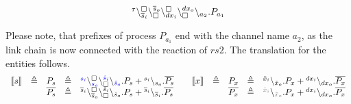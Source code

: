 \begin{example}
\[\begin{array}{lcl}
\startchain{\silent}\chainedlink{\overline{s}_i}{\noact}\chainedlink{\noact}{\overline{s}_o}    \chainedlink{dx_i}{\noact}\chainedlink{\noact}{dx_o}\chainend{a_2}.P_{a_1}\\
%
\end{array}
\]

\noindent
Please note, that prefixes of process $P_{a_1}$ end with the channel name $a_2$, as the link chain is now connected with the  reaction of  $rs2$.
The translation for the entities follows.
\[
\begin{array}{lclcl@{\qquad}lclcl}
\llbracket s \rrbracket &\defeq &P_{s}&\defeq &\startchain{{\color{blue}s_i}}\chainedlink{{\color{blue}s_o}}{\noact}\chainedlink{\noact}{{\color{blue}\hat{s}_i}}\chainend{{\color{blue}\hat{s}_o}}.P_{s} + \startchain{s_i}\chainend{s_o}.\overline{P_{s}}
&
\llbracket x \rrbracket &\defeq& P_{x}&\defeq &\startchain{\tilde{x}_i}\chainend{\tilde{x}_o}.P_{x} +  \startchain{dx_i}\chainend{dx_o}.\overline{P_{x}}\\
&&\overline{P_{s}}&\defeq &\startchain{\overline{s}_i}\chainedlink{\overline{s}_o}{\noact}\chainedlink{\noact}{\hat{s}_i}\chainend{\hat{s}_o}.P_{s}+\startchain{\overline{s}_i}\chainend{\overline{s}_i}.\overline{P_{s}}
&
&& \overline{P_{x}}&\defeq &\startchain{{\color{gray}\tilde{x}_i}}\chainend{{\color{gray}\tilde{x}_o}}.P_{x} +  \startchain{dx_i}\chainend{dx_o}.\overline{P_{x}}\\
%

\end{array}
\]



\end{example}
